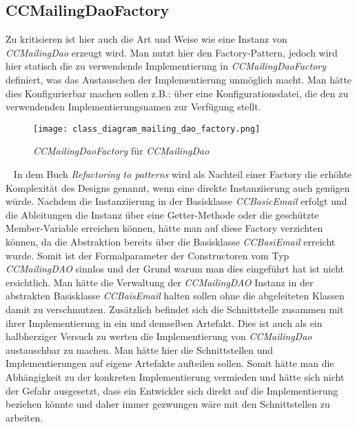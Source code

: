 \subsection{CCMailingDaoFactory}
Zu kritisieren ist hier auch die Art und Weise wie eine Instanz von \emph{CCMailingDao} erzeugt wird. Man nutzt hier den Factory-Pattern, jedoch wird hier statisch die zu verwendende Implementierung in \emph{CCMailingDaoFactory} definiert, was das Austauschen der Implementierung unmöglich macht. Man hätte dies Konfigurierbar machen sollen z.B.: über eine Konfigurationsdatei, die den zu verwendenden Implementierungsnamen zur Verfügung stellt.
\begin{figure}[h]
\centering
\texttt{[image: class\_diagram\_mailing\_dao\_factory.png]} 
\caption{\emph{CCMailingDaoFactory} für \emph{CCMailingDao}}
\label{fig:klassen-hierarchie-ccmailingfactory}
\end{figure}
\ \newline 
In dem Buch \emph{Refactoring to patterns} \cite[72]{refactoreToPatterns} wird als Nachteil einer Factory die erhöhte Komplexität des Designs genannt, wenn eine direkte Instanziierung auch genügen würde. Nachdem die Instanziierung in der Basisklasse \emph{CCBasicEmail} erfolgt und die Ableitungen die Instanz über eine Getter-Methode oder die geschützte Member-Variable erreichen können, hätte man auf diese Factory verzichten können, da die Abstraktion bereits über die Basisklasse \emph{CCBasiEmail} erreicht wurde. Somit ist der Formalparameter der Constructoren vom Typ \emph{CCMailingDAO} sinnlos und der Grund warum man dies eingeführt hat ist nicht ersichtlich. Man hätte die Verwaltung der \emph{CCMailingDAO} Instanz in der abstrakten Basisklasse \emph{CCBaisEmail} halten sollen ohne die abgeleiteten Klassen damit zu verschmutzen. 
\newline 
\newline
Zusätzlich befindet sich die Schnittstelle zusammen mit ihrer Implementierung in ein und demselben Artefakt. Dies ist auch als ein halbherziger Versuch zu werten die Implementierung von \emph{CCMailingDao} austauschbar zu machen. Man hätte hier die Schnittstellen und Implementierungen auf eigene Artefakte aufteilen sollen. Somit hätte man die Abhängigkeit zu der konkreten Implementierung vermieden und hätte sich nicht der Gefahr ausgesetzt, dass ein Entwickler sich direkt auf die Implementierung beziehen könnte und daher immer gezwungen wäre mit den Schnittstellen zu arbeiten.
\newpage
